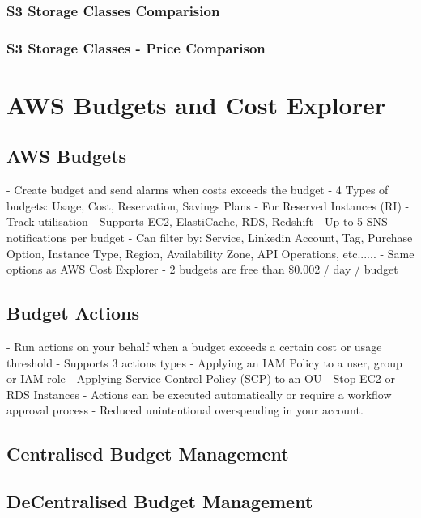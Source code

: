 \documentclass[11pt]{book}
\begin{document}
    \subsubsection{S3 Storage Classes Comparision}

    \subsubsection{S3 Storage Classes - Price Comparison}


    \section{AWS Budgets and Cost Explorer}

    \subsection{AWS Budgets}
    - Create budget and send alarms when costs exceeds the budget
    - 4 Types of budgets: Usage, Cost, Reservation, Savings Plans
    - For Reserved Instances (RI)
    - Track utilisation
    - Supports EC2, ElastiCache, RDS, Redshift
    - Up to 5 SNS notifications per budget
    - Can filter by: Service, Linkedin Account, Tag, Purchase Option, Instance Type, Region, Availability Zone, API Operations, etc......
    - Same options as AWS Cost Explorer
    - 2 budgets are free than \$0.002 / day / budget

    \subsection{Budget Actions}
    - Run actions on your behalf when a budget exceeds a certain cost or usage threshold
    - Supports 3 actions types
    - Applying an IAM Policy to a user, group or IAM role
    - Applying Service Control Policy (SCP) to an OU
    - Stop EC2 or RDS Instances
    - Actions can be executed automatically or require a workflow approval process
    - Reduced unintentional overspending in your account.

    \subsection{Centralised Budget Management}

    \subsection{DeCentralised Budget Management}
\end{document}
